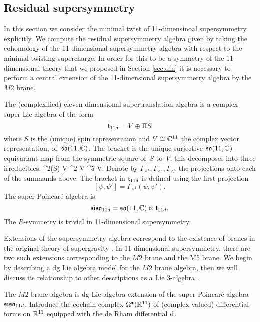 \documentclass[11pt]{amsart}
\begin{document}
\subsection{Residual supersymmetry} 


In this section we consider the minimal twist of 11-dimensinoal supersymmetry explicitly. 
We compute the residual supersymmetry algebra given by taking the cohomology of the 11-dimensional supersymmetry algebra with respect to the minimal twisting supercharge. 
In order for this to be a symmetry of the 11-dimensional theory that we proposed in Section \ref{sec:dfn} it is necessary to perform a central extension of the 11-dimensional supersymmetry algebra by the $M2$ brane.


The (complexified) eleven-dimensional supertranslation algebra is a complex super Lie algebra of the form
\[
  \mathfrak t_{11d} = V \oplus \Pi S
\]
where $S$ is the (unique) spin representation and $V \cong \mathbb C^{11}$ the complex vector representation, of~$\mathfrak{so}(11, \mathbb C)$. 
The bracket is the unique surjective $\mathfrak{so}(11,\mathbb C)$-equivariant map from the symmetric square of~$S$ to~$V$;
this decomposes into three irreducibles, 
\beqn\label{eqn:decomp}
  \Sym^2(S) \cong V \oplus \wedge^2 V \oplus \wedge^5 V.
\eeqn
Denote by $\Gamma_{\wedge^1}, \Gamma_{\wedge^2}, \Gamma_{\wedge^5}$ the projections onto each of the summands above. 
The bracket in $\mathfrak t_{11d}$ is defined using the first projection
\[
[\psi, \psi'] = \Gamma_{\wedge^1} (\psi, \psi') .
\]
The super Poincar\'{e} algebra is
\[
  \mathfrak{siso}_{11d} = \mathfrak{so}(11 , \mathbb C) \ltimes \mathfrak t_{11d} .
\]
The $R$-symmetry is trivial in 11-dimensional supersymmetry. 



Extensions of the supersymmetry algebra correspond to the existence of branes in the original theory of supergravity . 
In 11-dimensional supersymmetry, there are two such extensions corresponding to the $M2$ brane and the M5 brane.
We begin by describing a dg Lie algebra model for the $M2$ brane algebra, then we will discuss its relationship to other descriptions as a Lie 3-algebra \cite{Basu_2005,Bagger_2007,fiorenza2015super}. 

The $M2$ brane algebra is dg Lie algebra extension of the super Poincar\'e algebra $\mathfrak{siso}_{11d}$.
Introduce the cochain complex $\Omega^{\bullet}(\mathbb R^{11})$ of (complex valued) differential forms on $\mathbb R^{11}$ equipped with the de Rham differential ${\rm d}$.  
 
\end{document}
